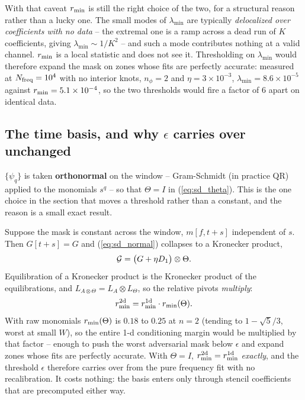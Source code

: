 \documentclass{article}
\numberwithin{equation}{section}   %
\begin{document}
With that caveat $r_{\rm min}$ is still the right choice of the two, for a structural reason rather than a
lucky one.  The small modes of $\lambda_{\min}$ are typically {\em delocalized over coefficients with no data}
-- the extremal one is a ramp across a dead run of $K$ coefficients, giving $\lambda_{\min} \sim 1/K^2$ -- and
such a mode contributes nothing at a valid channel.  $r_{\rm min}$ is a local statistic and does not see it.
Thresholding on $\lambda_{\min}$ would therefore expand the mask on zones whose fits are perfectly accurate:
measured at $N_{\rm freq} = 10^4$ with no interior knots, $n_\phi = 2$ and $\eta = 3\times10^{-3}$,
$\lambda_{\min} = 8.6\times10^{-5}$ against $r_{\rm min} = 5.1\times10^{-4}$, so the two thresholds would fire
a factor of $6$ apart on identical data.

\subsection{The time basis, and why $\epsilon$ carries over unchanged}
\label{sec:sd_kron}

$\{\psi_q\}$ is taken {\bf orthonormal} on the window -- Gram-Schmidt (in practice QR) applied to the monomials
$s^q$ -- so that $\Theta = I$ in (\ref{eq:sd_theta}).  This is the one choice in the section that moves a
threshold rather than a constant, and the reason is a small exact result.

Suppose the mask is constant across the window, $m[f,t+s]$ independent of $s$.  Then $G[t+s] = G$ and
(\ref{eq:sd_normal}) collapses to a Kronecker product,
\begin{equation}
{\cal G} = \big(G + \eta D_1\big) \otimes \Theta .
\label{eq:sd_kron}
\end{equation}
Equilibration of a Kronecker product is the Kronecker product of the equilibrations, and
$L_{A \otimes \Theta} = L_A \otimes L_\Theta$, so the relative pivots {\em multiply}:
\begin{equation}
r_{\rm min}^{\rm 2d} = r_{\rm min}^{\rm 1d} \cdot r_{\rm min}(\Theta) .
\label{eq:sd_kron_rmin}
\end{equation}
With raw monomials $r_{\rm min}(\Theta)$ is $0.18$ to $0.25$ at $n = 2$ (tending to $1 - \sqrt5/3$, worst at
small $W$), so the entire 1-d conditioning margin would be multiplied by that factor -- enough to push the
worst adversarial mask below $\epsilon$ and expand zones whose fits are perfectly accurate.  With $\Theta = I$,
$r_{\rm min}^{\rm 2d} = r_{\rm min}^{\rm 1d}$ {\em exactly}, and the threshold $\epsilon$ therefore carries
over from the pure frequency fit with no recalibration.  It costs nothing: the basis enters only through
stencil coefficients that are precomputed either way.
\end{document}
